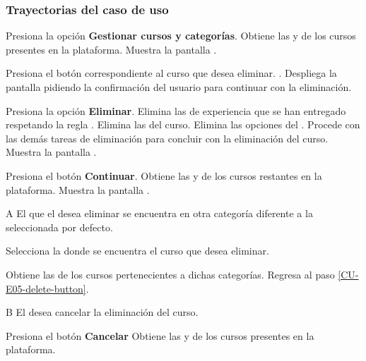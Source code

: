 \clearpage
\subsubsection{Trayectorias del caso de uso}

\begin{UCtrayectoria}%
%
  \Actor Presiona la opción {\bf Gestionar cursos y categorías}.
  \Sistema Obtiene las  y 
            de los cursos presentes en la plataforma.
  \Sistema Muestra la pantalla . 

  \Actor Presiona el botón \IUEliminar correspondiente al curso que desea eliminar.
         \label{CU-E05-delete-button}. 
  \Sistema Despliega la pantalla  pidiendo la confirmación del 
           usuario para continuar con la eliminación.

  \Actor Presiona la opción {\bf Eliminar}. 
  \Sistema Elimina las  de experiencia que se han 
           entregado respetando la regla .
  \Sistema Elimina las  del curso.
  \Sistema Elimina las opciones del .
  \Sistema Procede con las demás tareas de eliminación para concluir con la 
           eliminación del curso.
  \Sistema Muestra la pantalla .

  \Actor Presiona el botón {\bf Continuar}.
  \Sistema Obtiene las  y 
            de los cursos restantes en la plataforma.
  \Sistema Muestra la pantalla .
\end{UCtrayectoria}

\begin{UCtrayectoriaA}{A}{%
El  que el  desea eliminar se encuentra 
en otra categoría diferente a la seleccionada por defecto.}

  \Actor Selecciona la  donde se encuentra el curso
         que desea eliminar.

  \Sistema Obtiene las  de los cursos pertenecientes a
           dichas categorías.
  \Sistema Regresa al paso \ref{CU-E05-delete-button}.
\end{UCtrayectoriaA}

\begin{UCtrayectoriaA}{B}{%
El  desea cancelar la eliminación del curso.}

  \Actor Presiona el botón {\bf Cancelar}
  \Sistema Obtiene las  y 
            de los cursos presentes en la plataforma.
\end{UCtrayectoriaA}
